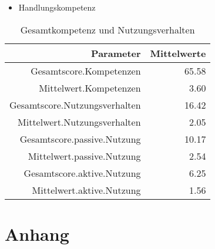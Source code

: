 \documentclass[12pt, bibliography=totoc]{scrartcl}
\begin{document}
\begin{itemize}
\tightlist
\item
  Handlungskompetenz
\end{itemize}

\begin{table}[H]
\centering
\caption{Gesamtkompetenz und Nutzungsverhalten}
\begin{tabular}{rr}
  \hline
 Parameter & Mittelwerte\\
  \hline
Gesamtscore.Kompetenzen & 65.58 \\
  Mittelwert.Kompetenzen & 3.60 \\
  Gesamtscore.Nutzungsverhalten & 16.42 \\
  Mittelwert.Nutzungsverhalten & 2.05 \\
  Gesamtscore.passive.Nutzung & 10.17 \\
  Mittelwert.passive.Nutzung & 2.54 \\
  Gesamtscore.aktive.Nutzung & 6.25 \\
  Mittelwert.aktive.Nutzung & 1.56 \\
   \hline
\end{tabular}
\end{table}

\pagebreak

\pagebreak
\printbibliography
\pagebreak
\appendix


  \section{Anhang}
  


%
%
\end{document}
